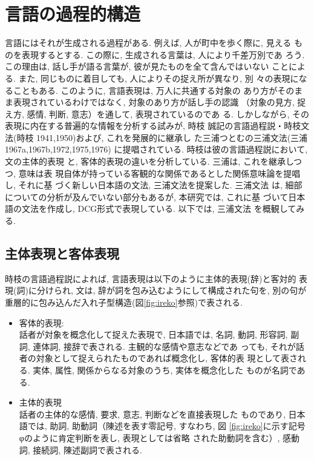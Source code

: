 \section{言語の過程的構造}
言語にはそれが生成される過程がある. 例えば, 人が町中を歩く際に, 見える
ものを表現するとする. この際に, 生成される言葉は, 人により千差万別であ
ろう. この理由は, 話し手が語る言葉が, 彼が見たものを全て含んではいない
ことによる. また, 同じものに着目しても, 人によりその捉え所が異なり, 別
々の表現になることもある. このように, 言語表現は, 万人に共通する対象の
あり方がそのまま表現されているわけではなく, 対象のあり方が話し手の認識
（対象の見方, 捉え方, 感情, 判断, 意志）を通して, 表現されているのであ
る. しかしながら, その表現に内在する普遍的な情報を分析する試みが, 時枝
誠記の言語過程説・時枝文法(時枝 1941,1950)および, これを発展的に継承し
た三浦つとむの三浦文法(三浦 1967a,1967b,1972,1975,1976)
に提唱されている. 時枝は彼の言語過程説において, 文の主体的表現
と, 客体的表現の違いを分析している. 三浦は, これを継承しつつ, 意味は表
現自体が持っている客観的な関係であるとした関係意味論を提唱し, それに基
づく新しい日本語の文法, 三浦文法を提案した. 三浦文法
は, 細部についての分析が及んでいない部分もあるが, 本研究では, これに基
づいて日本語の文法を作成し, DCG形式で表現している. 以下では, 三浦文法
を概観してみる. 

\subsection{主体表現と客体表現}
時枝の言語過程説によれば, 言語表現は以下のように主体的表現(辞)と客対的
表現(詞)に分けられ, 文は, 辞が詞を包み込むようにして構成された句を, 
別の句が重層的に包み込んだ入れ子型構造(図\ref{fig:ireko}参照)で表される. 
\begin{itemize}
\item 客体的表現:\\
話者が対象を概念化して捉えた表現で, 日本語では, 名詞, 
動詞, 形容詞, 副詞, 連体詞, 接辞で表される. 主観的な感情や意志などであ
っても, それが話者の対象として捉えられたものであれば概念化し, 客体的表
現として表される. 実体, 属性, 関係からなる対象のうち, 実体を概念化した
ものが名詞である. 
\item 主体的表現\\
話者の主体的な感情, 要求, 意志, 判断などを直接表現した
ものであり, 日本語では, 助詞, 助動詞（陳述を表す零記号, すなわち, 図
\ref{fig:ireko}に示す記号φのように肯定判断を表し, 表現としては省略
された助動詞を含む）, 感動詞, 接続詞, 陳述副詞で表される. 
\end{itemize}

